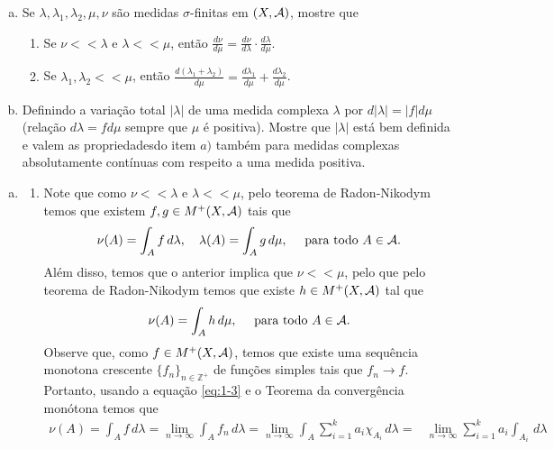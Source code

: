 \begin{homeworkProblem}[3]
  \begin{enumerate}[a)]
    \item Se $\lambda,\lambda_1,\lambda_2,\mu,\nu$ são medidas $\sigma$-finitas em $(X,\mathcal{A})$, mostre que
      \begin{enumerate}[1)]
        \item Se $\nu<<\lambda$ e $\lambda<<\mu$, então $\frac{d\nu}{d\mu}=\frac{d\nu}{d\lambda}\cdot\frac{d\lambda}{d\mu}$.
        \item Se $\lambda_1,\lambda_2<<\mu$, então $\frac{d(\lambda_1+\lambda_2)}{d\mu}=\frac{d\lambda_1}{d\mu}+\frac{d\lambda_2}{d\mu}$. 
      \end{enumerate}
    \item Definindo a variação total $|\lambda|$ de uma medida complexa $\lambda$ por $d|\lambda|=|f|d\mu$ (relação $d\lambda=fd\mu$ sempre que $\mu$ é positiva). Mostre que $|\lambda|$ está bem definida e valem as propriedadesdo item $a)$ também para medidas complexas absolutamente contínuas com respeito a uma medida positiva. 
  \end{enumerate}
  \begin{solution}
  \begin{enumerate}[a)]
    \item
    \begin{enumerate}[1)]
      \item Note que como $\nu<<\lambda$ e $\lambda<<\mu$, pelo teorema de Radon-Nikodym temos que existem $f,g\in M^{+}(X,\mathcal{A})$ tais que
        \begin{equation}\label{eq:1-3}
          \nu(A)=\int_{A}f\,d\lambda,\quad \lambda(A)=\int_{A}g\,d\mu,\quad\text{ para todo }A\in\mathcal{A}.
        \end{equation}
        Além disso, temos que o anterior implica que $\nu<<\mu$, pelo que pelo teorema de Radon-Nikodym temos que existe $h\in M^{+}(X,\mathcal{A})$ tal que
        \begin{align*}
          \nu(A)=\int_{A}h\,d\mu,\quad\text{ para todo }A\in\mathcal{A}. 
        \end{align*}
        Observe que, como $f\in M^{+}(X,\mathcal{A})$, temos que existe uma sequência monotona crescente $\{f_n\}_{n\in\mathbb{Z}^{+}}$ de funções simples tais que $f_n\to f$. Portanto, usando a equação \eqref{eq:1-3} e o Teorema da convergência monótona temos que
        \begin{align*}
          \nu(A)=\int_{A}f\,d\lambda=\lim_{n \to \infty}\int_{A}f_n\,d\lambda=\lim_{n \to \infty}\int_{A}\sum_{i=1}^{k}a_i\chi_{A_i}\,d\lambda=&\lim_{n \to \infty}\sum_{i=1}^{k}a_i \int_{A_i}\,d\lambda\\

\end{align*}
\end{enumerate}
\end{enumerate}
\end{solution}
\end{homeworkProblem}
